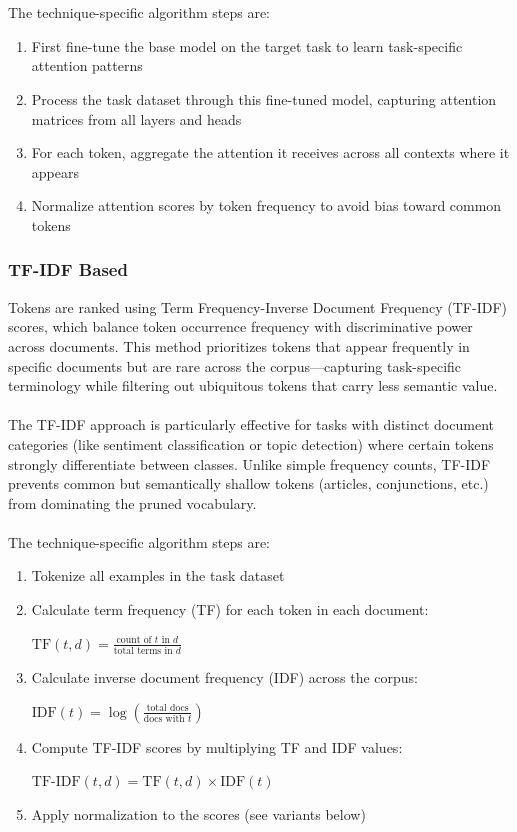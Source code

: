 \documentclass[twocolumn]{article}
\begin{document}
\\ \\
The technique-specific algorithm steps are:
\begin{enumerate}
    \item First fine-tune the base model on the target task to learn task-specific attention patterns
    \item Process the task dataset through this fine-tuned model, capturing attention matrices from all layers and heads
    \item For each token, aggregate the attention it receives across all contexts where it appears
    \item Normalize attention scores by token frequency to avoid bias toward common tokens
\end{enumerate}
\subsubsection{TF-IDF Based}
Tokens are ranked using Term Frequency-Inverse Document Frequency (TF-IDF) scores, which balance token occurrence frequency with discriminative power across documents. This method prioritizes tokens that appear frequently in specific documents but are rare across the corpus—capturing task-specific terminology while filtering out ubiquitous tokens that carry less semantic value.
\\ \\
The TF-IDF approach is particularly effective for tasks with distinct document categories (like sentiment classification or topic detection) where certain tokens strongly differentiate between classes. Unlike simple frequency counts, TF-IDF prevents common but semantically shallow tokens (articles, conjunctions, etc.) from dominating the pruned vocabulary.
\\ \\
The technique-specific algorithm steps are:
\begin{enumerate}
    \item Tokenize all examples in the task dataset
    \item Calculate term frequency (TF) for each token in each document:
        \begin{center}
        $\text{TF}(t,d) = \frac{\text{count of $t$ in $d$}}{\text{total terms in $d$}}$
        \end{center}
    \item Calculate inverse document frequency (IDF) across the corpus:
        \begin{center}
        $\text{IDF}(t) = \log\left(\frac{\text{total docs}}{\text{docs with $t$}}\right)$
        \end{center}
    \item Compute TF-IDF scores by multiplying TF and IDF values:
        \begin{center}
        $\text{TF-IDF}(t,d) = \text{TF}(t,d) \times \text{IDF}(t)$
        \end{center}
    \item Apply normalization to the scores (see variants below)
\end{enumerate}
\end{document}
